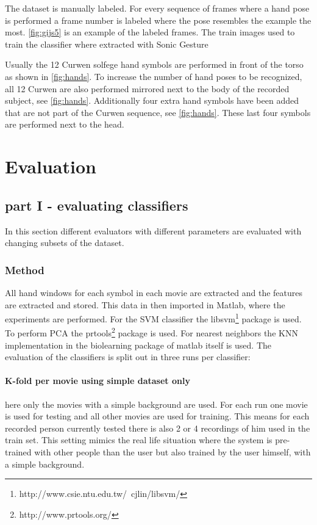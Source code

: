 The dataset is manually labeled. For every sequence of frames where a hand pose is performed a frame number is labeled where the pose resembles the example the most. \autoref{fig:gijs5} is an example of the labeled frames. The train images used to train the classifier where extracted with Sonic Gesture

Usually the 12 Curwen solfege hand symbols are performed in front of the torso as shown in \autoref{fig:hands}. To increase the number of hand poses to be recognized, all 12 Curwen are also performed mirrored next to the body of the recorded subject, see \autoref{fig:hands}. Additionally four extra hand symbols have been added that are not part of the Curwen sequence, see \autoref{fig:hands}. These last four symbols are performed next to the head.

\section{Evaluation}

\subsection{part I - evaluating classifiers}
In this section different evaluators with different parameters are evaluated with changing subsets of the dataset.

\subsubsection{Method}
All hand windows for each symbol in each movie are extracted and the features are extracted and stored. This data in then imported in Matlab, where the experiments are performed. For the SVM classifier the libsvm\footnote{http://www.csie.ntu.edu.tw/~cjlin/libsvm/} package is used. To perform PCA the prtools\footnote{http://www.prtools.org/} package is used. For nearest neighbors the KNN implementation in the biolearning package of matlab itself is used. The evaluation of the classifiers is split out in three runs per classifier:

\paragraph{K-fold per movie using simple dataset only}
here only the movies with a simple background are used. For each run one movie is used for testing and all other movies are used for training. This means for each recorded person currently tested there is also 2 or 4 recordings of him used in the train set. This setting mimics the real life situation where the system is pre-trained with other people than the user but also trained by the user himself, with a simple background.

